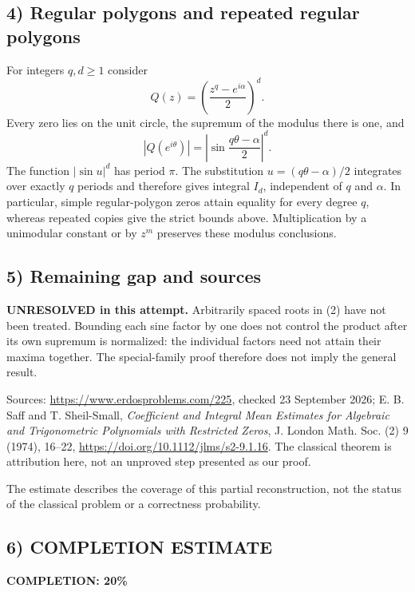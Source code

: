 \subsection*{4) Regular polygons and repeated regular polygons}
For integers $q,d\ge1$ consider
\[
 Q(z)=\left(\frac{z^q-e^{i\alpha}}2\right)^d.
\]
Every zero lies on the unit circle, the supremum of the modulus there is one, and
\[
 |Q(e^{i\theta})|=\left|\sin\frac{q\theta-\alpha}{2}\right|^d.
\]
The function $|\sin u|^d$ has period $\pi$. The substitution $u=(q\theta-\alpha)/2$ integrates over exactly $q$ periods and therefore gives integral $I_d$, independent of $q$ and $\alpha$. In particular, simple regular-polygon zeros attain equality for every degree $q$, whereas repeated copies give the strict bounds above. Multiplication by a unimodular constant or by $z^m$ preserves these modulus conclusions.

\subsection*{5) Remaining gap and sources}
\textbf{UNRESOLVED in this attempt.} Arbitrarily spaced roots in (2) have not been treated. Bounding each sine factor by one does not control the product after its own supremum is normalized: the individual factors need not attain their maxima together. The special-family proof therefore does not imply the general result.

Sources: \url{https://www.erdosproblems.com/225}, checked 23 September 2026; E. B. Saff and T. Sheil-Small, \emph{Coefficient and Integral Mean Estimates for Algebraic and Trigonometric Polynomials with Restricted Zeros}, J. London Math. Soc. (2) 9 (1974), 16--22, \url{https://doi.org/10.1112/jlms/s2-9.1.16}. The classical theorem is attribution here, not an unproved step presented as our proof.

The estimate describes the coverage of this partial reconstruction, not the status of the classical problem or a correctness probability.
\subsection*{6) COMPLETION ESTIMATE}
\textbf{COMPLETION: 20\%}

